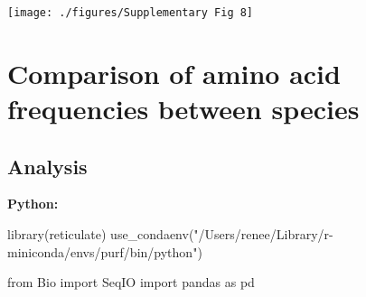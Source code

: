 \documentclass[
  11pt,
  oneside]{book}
\newenvironment{Shaded}{\begin{snugshade}}{\end{snugshade}}
\newcommand{\FunctionTok}[1]{\textcolor[rgb]{0.00,0.00,0.00}{#1}}
\newcommand{\ImportTok}[1]{#1}
\newcommand{\NormalTok}[1]{#1}
\newcommand{\StringTok}[1]{\textcolor[rgb]{0.31,0.60,0.02}{#1}}
\begin{document}
\begin{center}\texttt{[image: ./figures/Supplementary Fig 8]} \end{center}

\hypertarget{comparison-of-amino-acid-frequencies-between-species}{%
\section{Comparison of amino acid frequencies between species}\label{comparison-of-amino-acid-frequencies-between-species}}

\hypertarget{analysis-6}{%
\subsection{Analysis}\label{analysis-6}}

\textbf{Python: }

\begin{Shaded}
\begin{Highlighting}[]
\FunctionTok{library}\NormalTok{(reticulate)}
\FunctionTok{use\_condaenv}\NormalTok{(}\StringTok{"/Users/renee/Library/r{-}miniconda/envs/purf/bin/python"}\NormalTok{)}
\end{Highlighting}
\end{Shaded}

\begin{Shaded}
\begin{Highlighting}[]
\ImportTok{from}\NormalTok{ Bio }\ImportTok{import}\NormalTok{ SeqIO}
\ImportTok{import}\NormalTok{ pandas }\ImportTok{as}\NormalTok{ pd}
\end{Highlighting}
\end{Shaded}
\end{document}
